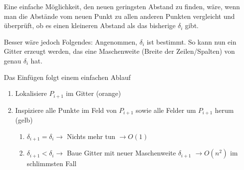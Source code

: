 \documentclass{scrartcl}%
\begin{document}
    Eine einfache Möglichkeit, den neuen geringsten Abstand zu finden, wäre,
    wenn man die Abstände vom neuen Punkt zu allen anderen Punkten vergleicht und überprüft,
    ob es einen kleineren Abstand als das bisherige $\delta_i$ gibt.

    Besser wäre jedoch Folgendes: Angenommen, $\delta_i$ ist bestimmt.
    So kann nun ein Gitter erzeugt werden, das eine Maschenweite
    (Breite der Zeilen/Spalten) von genau $\delta_i$ hat.

    \begin{figure}[h]
        \centering
        \begin{table}[H]
            \centering
        \end{table}
    \end{figure}

    \newpage
    Das Einfügen folgt einem einfachen Ablauf

    \begin{enumerate}
        \item Lokalisiere $P_{i+1}$ im Gitter (orange)
        \item Inspiziere alle Punkte im Feld von $P_{i+1}$ sowie alle Felder um $P_{i+1}$ herum (gelb)
        \begin{enumerate}
            \item $\delta_{i+1} = \delta_i \rightarrow$ Nichts mehr tun $\rightarrow O(1)$
            \item $\delta_{i+1} < \delta_i \rightarrow$ Baue Gitter mit neuer Maschenweite
            $\delta_{i+1}$ $\rightarrow O(n^2)$ im schlimmsten Fall
        \end{enumerate}
    \end{enumerate}
\end{document}
